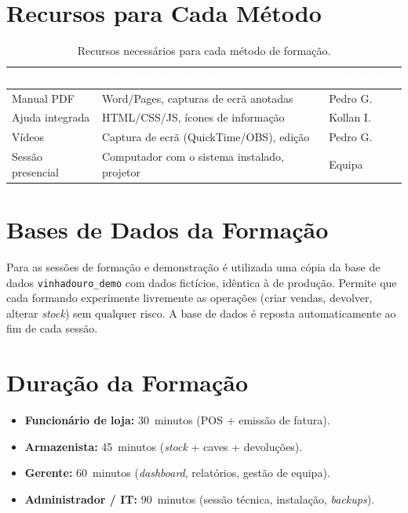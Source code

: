 \documentclass[11pt,a4paper]{report}
\begin{document}
\section{Recursos para Cada Método}

\begin{table}[H]
\centering\small
\begin{tabularx}{\textwidth}{L{3cm} X L{2.6cm}}
\toprule
{}
\textbf{\textcolor{white}{Método}} &
\textbf{\textcolor{white}{Recursos Necessários}} &
\textbf{\textcolor{white}{Responsável}} \\
\midrule
Manual PDF & Word/Pages, capturas de ecrã anotadas & Pedro G. \\
Ajuda integrada & HTML/CSS/JS, ícones de informação & Kollan I. \\
Vídeos & Captura de ecrã (QuickTime/OBS), edição & Pedro G. \\
Sessão presencial & Computador com o sistema instalado, projetor & Equipa \\
\bottomrule
\end{tabularx}
\caption{Recursos necessários para cada método de formação.}
\label{tab:formacao}
\end{table}

\section{Bases de Dados da Formação}
Para as sessões de formação e demonstração é utilizada uma cópia da base de dados \texttt{vinhadouro\_demo} com dados fictícios, idêntica à de produção. Permite que cada formando experimente livremente as operações (criar vendas, devolver, alterar \textit{stock}) sem qualquer risco. A base de dados é reposta automaticamente ao fim de cada sessão.

\section{Duração da Formação}

\begin{itemize}
  \item \textbf{Funcionário de loja:} 30~minutos (POS + emissão de fatura).
  \item \textbf{Armazenista:} 45~minutos (\textit{stock} + caves + devoluções).
  \item \textbf{Gerente:} 60~minutos (\textit{dashboard}, relatórios, gestão de equipa).
  \item \textbf{Administrador / IT:} 90~minutos (sessão técnica, instalação, \textit{backups}).
\end{itemize}
\end{document}
